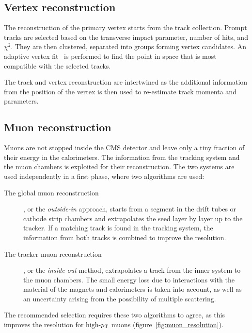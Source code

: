 \subsection{Vertex reconstruction}
The reconstruction of the primary vertex starts from the track collection.
Prompt tracks are selected based on the transverse impact parameter, number
of hits, and $\chi^2$. They are then clustered, \ie separated into groups
forming vertex candidates.
An adaptive vertex fit~\cite{adaptive} is performed to find the point in space that is most
compatible with the selected tracks.

The track and vertex reconstruction are
intertwined as the additional information from the position of the vertex is
then used to re-estimate track momenta and parameters.
\subsection{Muon reconstruction}
Muons are not stopped inside the CMS detector and leave only a tiny fraction
of their energy in the calorimeters. The information from the tracking
system and the muon chambers is exploited for their reconstruction.
The two systems are used independently in a first phase, where two
algorithms are used:
\begin{description}
    \item[The global muon reconstruction], or the \emph{outside-in}
        approach, starts from a segment in the drift tubes or cathode strip
        chambers and extrapolates the seed layer by layer up to the
        tracker. If a matching track is found in the tracking system, the
        information from both tracks is combined to improve the resolution.
    \item[The tracker muon reconstruction], or the \emph{inside-out} method,
        extrapolates a track from the inner system to the muon chambers. The
        small energy loss due to interactions with the material of the
        magnets and calorimeters is taken into account, as well as an
        uncertainty arising from the possibility of multiple scattering.
\end{description}
The recommended selection requires these two algorithms to agree, as this
improves the resolution for high-$p_\mathrm{T}$ muons
(figure~\ref{fig:muon_resolution}).

